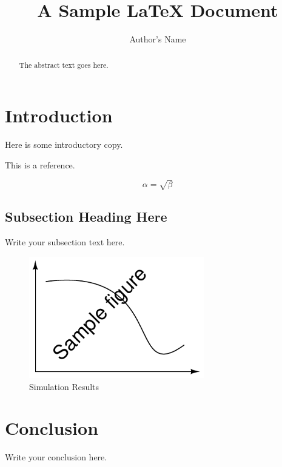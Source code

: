 \documentclass{article}
\begin{document}
\title{A Sample \LaTeX{} Document}
\author{Author's Name}

\maketitle

\begin{abstract}
The abstract text goes here.
\end{abstract}

\section{Introduction}
Here is some introductory copy.

This is a reference\cite{Flanagan2011}.

\begin{equation}
    \label{simple_equation}
    \alpha = \sqrt{ \beta }
\end{equation}

\subsection{Subsection Heading Here}
Write your subsection text here.

\begin{figure}
    \centering
    \includegraphics[width=3.0in]{figure}
    \caption{Simulation Results}
    \label{simulationfigure}
\end{figure}

\section{Conclusion}
Write your conclusion here.



\end{document}
